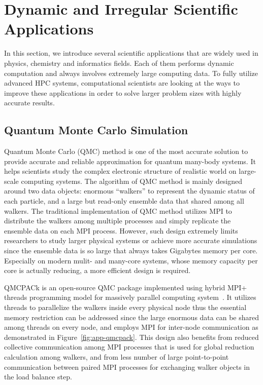 \section{Dynamic and Irregular Scientific Applications}\label{sec:back-apps}
In this section, we introduce several scientific applications that are
widely used in physics, chemistry and informatics fields. Each of them
performs dynamic computation and always involves extremely large computing
data. To fully utilize advanced HPC systems, computational scientists are
looking at the ways to improve these applications in order to solve larger
problem sizes with highly accurate results.

\subsection{Quantum Monte Carlo Simulation}
Quantum Monte Carlo (QMC) method is one of the most accurate solution to
provide accurate and reliable approximation for quantum many-body systems.
It helps scientists study the complex electronic structure of realistic
world on large-scale computing systems. The algorithm of QMC method is
mainly designed around two data objects: enormous ``walkers'' to represent
the dynamic status of each particle, and a large but read-only ensemble
data that shared among all walkers. The traditional implementation of
QMC method utilizes MPI to distribute the walkers among multiple processes
and simply replicate the ensemble data on each MPI process. However,
such design extremely limits researchers to study larger physical systems
or achieve more accurate simulations since the ensemble data is so large
that always takes Gigabytes memory per core. Especially on modern
mulit- and many-core systems, whose memory capacity per core is actually
reducing, a more efficient design is required.

QMCPACk is an open-source QMC package implemented using hybrid MPI+
threads programming model for massively parallel computing system~\cite{qmcpack}.
It utilizes threads to parallelize the walkers inside every physical node
thus the essential memory restriction can be addressed since the large
enormous data can be shared among threads on every node, and employs MPI
for inter-node communication as demonstrated in Figure~\ref{fig:app-qmcpack}.
This design also benefits from reduced collective communication among
MPI processes that is used for global reduction calculation among walkers,
and from less number of large point-to-point communication between paired
MPI processes for exchanging walker objects in the load balance step.

